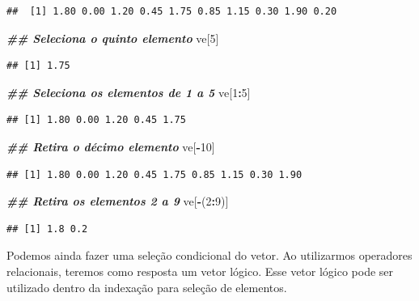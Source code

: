 \documentclass[
]{article}
\newenvironment{Shaded}{\begin{snugshade}}{\end{snugshade}}
\newcommand{\DecValTok}[1]{\textcolor[rgb]{0.00,0.00,0.81}{#1}}
\newcommand{\DocumentationTok}[1]{\textcolor[rgb]{0.56,0.35,0.01}{\textbf{\textit{#1}}}}
\newcommand{\NormalTok}[1]{#1}
\newcommand{\SpecialCharTok}[1]{\textcolor[rgb]{0.81,0.36,0.00}{\textbf{#1}}}
\begin{document}
\begin{verbatim}
##  [1] 1.80 0.00 1.20 0.45 1.75 0.85 1.15 0.30 1.90 0.20
\end{verbatim}

\begin{Shaded}
\begin{Highlighting}[]
\DocumentationTok{\#\# Seleciona o quinto elemento}
\NormalTok{ve[}\DecValTok{5}\NormalTok{]}
\end{Highlighting}
\end{Shaded}

\begin{verbatim}
## [1] 1.75
\end{verbatim}

\begin{Shaded}
\begin{Highlighting}[]
\DocumentationTok{\#\# Seleciona os elementos de 1 a 5}
\NormalTok{ve[}\DecValTok{1}\SpecialCharTok{:}\DecValTok{5}\NormalTok{]}
\end{Highlighting}
\end{Shaded}

\begin{verbatim}
## [1] 1.80 0.00 1.20 0.45 1.75
\end{verbatim}

\begin{Shaded}
\begin{Highlighting}[]
\DocumentationTok{\#\# Retira o décimo elemento}
\NormalTok{ve[}\SpecialCharTok{{-}}\DecValTok{10}\NormalTok{]}
\end{Highlighting}
\end{Shaded}

\begin{verbatim}
## [1] 1.80 0.00 1.20 0.45 1.75 0.85 1.15 0.30 1.90
\end{verbatim}

\begin{Shaded}
\begin{Highlighting}[]
\DocumentationTok{\#\# Retira os elementos 2 a 9}
\NormalTok{ve[}\SpecialCharTok{{-}}\NormalTok{(}\DecValTok{2}\SpecialCharTok{:}\DecValTok{9}\NormalTok{)]}
\end{Highlighting}
\end{Shaded}

\begin{verbatim}
## [1] 1.8 0.2
\end{verbatim}

Podemos ainda fazer uma seleção condicional do vetor. Ao utilizarmos operadores relacionais, teremos como resposta um vetor lógico. Esse vetor lógico pode ser utilizado dentro da indexação para seleção de elementos.
\end{document}
